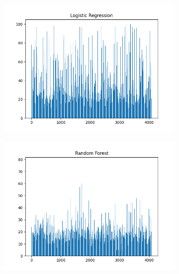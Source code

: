 \documentclass{article}
\begin{document}
\begin{figure}[H]
\begin{subfigure}{.33\textwidth}
  \centering
  \includegraphics[width=1\linewidth]{2c/Selection LR.png}  
  
  \label{fig:sub-first}
\end{subfigure}
\begin{subfigure}{.33\textwidth}
  \centering
  \includegraphics[width=1\linewidth]{2c/Selection RF.png}  
  

\end{subfigure}
\end{figure}
\end{document}
